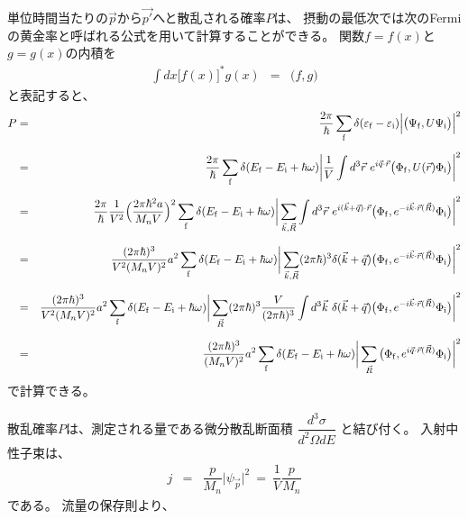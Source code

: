 \documentclass[a4j]{jsarticle}
\begin{document}
単位時間当たりの$\vec{p}$から$\vec{p'}$へと散乱される確率$P$は、
摂動の最低次では次のFermiの黄金率と呼ばれる公式を用いて計算することができる。
関数$f=f(x)$と$g=g(x)$の内積を
\begin{eqnarray}
	\int dx \big[ f(x) \big]^{*} g(x)
	&=&
	\big( f , g \big)
\end{eqnarray}
と表記すると、
\begin{eqnarray}
	P
	&=&
	\dfrac{2 \pi}{\hbar}
	\sum_{\rm f}
	\delta( \varepsilon_{\rm f} - \varepsilon_{\rm i} )
	\Big| \big( \Psi_{\rm f} , U \Psi_{\rm i} \big) \Big|^{2}
	\nonumber \\[2mm] &=&
	\dfrac{2 \pi}{\hbar}
	\sum_{\rm f}
	\delta( E_{\rm f} - E_{\rm i} + \hbar \omega )
	\bigg|
	\dfrac{1}{V} \int d^{3} \vec{r} \
	e^{i \vec{q} \cdot \vec{r}}
	\big( \Phi_{\rm f} , U(\vec{r}) \Phi_{\rm i} \big)
	\bigg|^{2}
	\nonumber \\[2mm] &=&
	\dfrac{2 \pi}{\hbar}
	\dfrac{1}{V^{2}}
	\Big( \dfrac{2 \pi \hbar^{2} a}{M_{n} V} \Big)^{2}
	\sum_{\rm f}
	\delta( E_{\rm f} - E_{\rm i} + \hbar \omega )
	\bigg|
	\sum_{ \vec{k} , \vec{R} }
	\int d^{3} \vec{r} \
	e^{i (\vec{k} + \vec{q} ) \cdot \vec{r}}
	\big( \Phi_{\rm f} ,
	e^{ - i \vec{k} \cdot \vec{r}(\vec{R}) }
	\Phi_{\rm i} \big)
	\bigg|^{2}
	\nonumber \\[2mm] &=&
	\dfrac{ ( 2 \pi \hbar )^{3} }{ V^{2} ( M_{n} V )^{2} } a^{2}
	\sum_{\rm f}
	\delta( E_{\rm f} - E_{\rm i} + \hbar \omega )
	\bigg|
	\sum_{ \vec{k},\vec{R} }
	( 2 \pi \hbar )^{3}
	\delta (\vec{k} + \vec{q} )
	\big( \Phi_{\rm f} ,
	e^{ - i \vec{k} \cdot \vec{r}(\vec{R}) }
	\Phi_{\rm i} \big)
	\bigg|^{2}
	\nonumber \\[2mm] &=&
	\dfrac{ ( 2 \pi \hbar )^{3} }{ V^{2} ( M_{n} V )^{2} } a^{2}
	\sum_{\rm f}
	\delta( E_{\rm f} - E_{\rm i} + \hbar \omega )
	\bigg|
	\sum_{ \vec{R} }
	( 2 \pi \hbar )^{3}
	\dfrac{V}{( 2 \pi \hbar )^{3}}
	\int d^{3} \vec{k} \
	\delta (\vec{k} + \vec{q} )
	\big( \Phi_{\rm f} ,
	e^{ - i \vec{k} \cdot \vec{r}(\vec{R}) }
	\Phi_{\rm i} \big)
	\bigg|^{2}
	\nonumber \\[2mm] &=&
	\dfrac{ ( 2 \pi \hbar )^{3} }{ ( M_{n} V )^{2} }
	a^{2}
	\sum_{\rm f}
	\delta( E_{\rm f} - E_{\rm i} + \hbar \omega )
	\bigg|
	\sum_{\vec{R}}
	\big( \Phi_{\rm f} , e^{i \vec{q} \cdot \vec{r}(\vec{R})} \Phi_{\rm i} \big)
	\bigg|^{2}
\end{eqnarray}
で計算できる。

散乱確率$P$は、測定される量である微分散乱断面積
$\dfrac{d^{3} \sigma}{d^{2} \Omega d E}$
と結び付く。
入射中性子束は、
\begin{eqnarray}
	j
	&=&
	\dfrac{p}{M_{n}} \big| \psi_{\vec{p}} \big|^{2}
	\ = \
	\dfrac{1}{V}
	\dfrac{p}{M_{n}}
\end{eqnarray}
である。
流量の保存則より、
\end{document}
